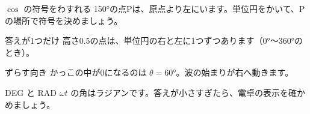 \noindent\begin{minipage}[t]{0.485\linewidth}\vspace{0pt}
\begin{tsumazuki}{$\cos$ の符号をわすれる}
150°の点Pは、原点より左にいます。単位円をかいて、Pの場所で符号を決めましょう。
\end{tsumazuki}
\end{minipage}\hfill
\begin{minipage}[t]{0.485\linewidth}\vspace{0pt}
\begin{tsumazuki}{答えが1つだけ}
高さ0.5の点は、単位円の右と左に1つずつあります（0°〜360°のとき）。
\end{tsumazuki}
\end{minipage}
\par\vspace{2pt}
\noindent\begin{minipage}[t]{0.485\linewidth}\vspace{0pt}
\begin{tsumazuki}{ずらす向き}
かっこの中が0になるのは $\theta=60°$。波の始まりが右へ動きます。
\end{tsumazuki}
\end{minipage}\hfill
\begin{minipage}[t]{0.485\linewidth}\vspace{0pt}
\begin{tsumazuki}{DEG と RAD}
$\omega t$ の角はラジアンです。答えが小さすぎたら、電卓の表示を確かめましょう。
\end{tsumazuki}
\end{minipage}

